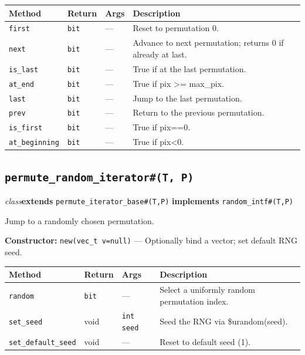 \documentclass[11pt,letterpaper]{report}
\begin{document}
\begin{xltabular}{\linewidth}{>{\small}p{1.35in} >{\small}p{1.25in} >{\small}p{0.95in} >{\small}X}
\toprule
\textbf{Method} & \textbf{Return} & \textbf{Args} & \textbf{Description} \\
\midrule
\endhead
\bottomrule
\endfoot
\texttt{first} & \texttt{bit} & --- & Reset to permutation 0. \\
\texttt{next} & \texttt{bit} & --- & Advance to next permutation; returns 0 if already at last. \\
\texttt{is\_last} & \texttt{bit} & --- & True if at the last permutation. \\
\texttt{at\_end} & \texttt{bit} & --- & True if pix \textgreater{}= max\_pix. \\
\texttt{last} & \texttt{bit} & --- & Jump to the last permutation. \\
\texttt{prev} & \texttt{bit} & --- & Return to the previous permutation. \\
\texttt{is\_first} & \texttt{bit} & --- & True if pix==0. \\
\texttt{at\_beginning} & \texttt{bit} & --- & True if pix\textless{}0. \\
\end{xltabular}

\subsection*{\texttt{permute\_random\_iterator\#(T, P)}}
\noindent\small\textit{class}\quad \textbf{extends} \texttt{permute\_iterator\_base\#(T,P)} \quad \textbf{implements} \texttt{random\_intf\#(T,P)}\par

Jump to a randomly chosen permutation.

\noindent\textbf{Constructor:} \texttt{new(vec\_t v=null)} --- Optionally bind a vector; set default RNG seed.

\begin{xltabular}{\linewidth}{>{\small}p{1.35in} >{\small}p{1.25in} >{\small}p{0.95in} >{\small}X}
\toprule
\textbf{Method} & \textbf{Return} & \textbf{Args} & \textbf{Description} \\
\midrule
\endhead
\bottomrule
\endfoot
\texttt{random} & \texttt{bit} & --- & Select a uniformly random permutation index. \\
\texttt{set\_seed} & void & \texttt{int seed} & Seed the RNG via \$urandom(seed). \\
\texttt{set\_default\_seed} & void & --- & Reset to default seed (1). \\
\end{xltabular}
\end{document}
